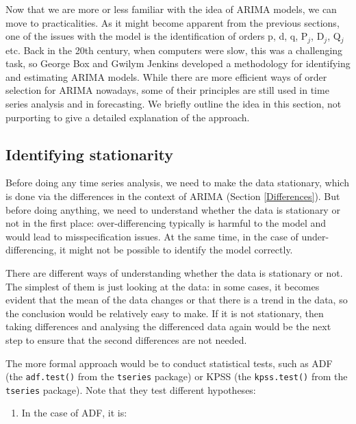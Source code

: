 \documentclass[]{book}
\providecommand{\tightlist}{%
  \setlength{\itemsep}{0pt}\setlength{\parskip}{0pt}}
\theoremstyle{definition}
\theoremstyle{definition}
\theoremstyle{definition}
\theoremstyle{definition}
\theoremstyle{remark}
\begin{document}
Now that we are more or less familiar with the idea of ARIMA models, we can move to practicalities. As it might become apparent from the previous sections, one of the issues with the model is the identification of orders p, d, q, P\(_j\), D\(_j\), Q\(_j\) etc. Back in the 20th century, when computers were slow, this was a challenging task, so George Box and Gwilym Jenkins \citep{Box1976} developed a methodology for identifying and estimating ARIMA models. While there are more efficient ways of order selection for ARIMA nowadays, some of their principles are still used in time series analysis and in forecasting. We briefly outline the idea in this section, not purporting to give a detailed explanation of the approach.

\hypertarget{identifying-stationarity}{%
\subsection{Identifying stationarity}\label{identifying-stationarity}}

Before doing any time series analysis, we need to make the data stationary, which is done via the differences in the context of ARIMA (Section \ref{Differences}). But before doing anything, we need to understand whether the data is stationary or not in the first place: over-differencing typically is harmful to the model and would lead to misspecification issues. At the same time, in the case of under-differencing, it might not be possible to identify the model correctly.

There are different ways of understanding whether the data is stationary or not. The simplest of them is just looking at the data: in some cases, it becomes evident that the mean of the data changes or that there is a trend in the data, so the conclusion would be relatively easy to make. If it is not stationary, then taking differences and analysing the differenced data again would be the next step to ensure that the second differences are not needed.

The more formal approach would be to conduct statistical tests, such as ADF (the \texttt{adf.test()} from the \texttt{tseries} package) or KPSS (the \texttt{kpss.test()} from the \texttt{tseries} package). Note that they test different hypotheses:

\begin{enumerate}
\def\labelenumi{\arabic{enumi}.}
\tightlist
\item
  In the case of ADF, it is:
\end{enumerate}
\end{document}
